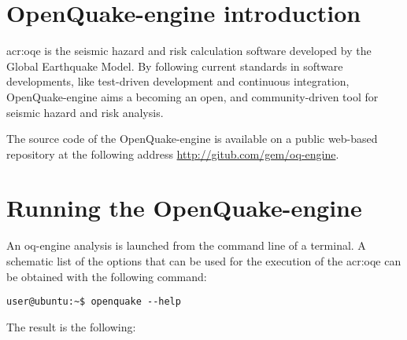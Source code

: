 \section{OpenQuake-engine introduction}
\gls{acr:oqe} is the seismic hazard and risk calculation software developed 
by the Global Earthquake Model. By following current standards in software 
developments, like test-driven development and continuous
integration, OpenQuake-engine aims a becoming an open, and community-driven tool for
seismic hazard and risk analysis.

The source code of the OpenQuake-engine is available on a public web-based 
repository at the following address 
\href{http://gitub.com/gem/oq-engine}{http://gitub.com/gem/oq-engine}.
\section{Running the OpenQuake-engine}
\label{sec:intro}
An oq-engine analysis is launched from the command line of a terminal. 
%
A schematic list of the options that can be used for the execution of the 
\gls{acr:oqe} can be obtained with the following command:
\begin{Verbatim}[frame=single, commandchars=\\\{\}, fontsize=\small]
user@ubuntu:~$ openquake --help
\end{Verbatim}
The result is the following:
